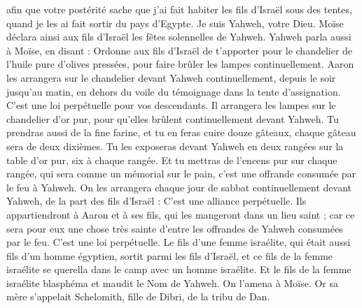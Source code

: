 \begin{multicols}{2}
afin que votre postérité sache que j'ai fait habiter les fils d'Israël sous des tentes, quand je les ai fait sortir du pays d'Egypte. Je suis Yahweh, votre Dieu.
Moïse déclara ainsi aux fils d'Israël les fêtes solennelles de Yahweh.
\VerseOne{}Yahweh parla aussi à Moïse, en disant :
Ordonne aux fils d'Israël de t'apporter pour le chandelier de l'huile pure d'olives pressées, pour faire brûler les lampes continuellement.
Aaron les arrangera sur le chandelier devant Yahweh continuellement, depuis le soir jusqu'au matin, en dehors du voile du témoignage dans la tente d'assignation. C'est une loi perpétuelle pour vos descendants.
Il arrangera les lampes sur le chandelier d'or pur, pour qu'elles brûlent continuellement devant Yahweh.
Tu prendras aussi de la fine farine, et tu en feras cuire douze gâteaux, chaque gâteau sera de deux dixièmes.
Tu les exposeras devant Yahweh en deux rangées sur la table d'or pur, six à chaque rangée.
Et tu mettras de l'encens pur sur chaque rangée, qui sera comme un mémorial sur le pain, c'est une offrande consumée par le feu à Yahweh.
On les arrangera chaque jour de sabbat continuellement devant Yahweh, de la part des fils d'Israël : C'est une alliance perpétuelle.
Ils appartiendront à Aaron et à ses fils, qui les mangeront dans un lieu saint ; car ce sera pour eux une chose très sainte d'entre les offrandes de Yahweh consumées par le feu. C'est une loi perpétuelle.
Le fils d'une femme israélite, qui était aussi fils d'un homme égyptien, sortit parmi les fils d'Israël, et ce fils de la femme israélite se querella dans le camp avec un homme israélite.
Et le fils de la femme israélite blasphéma et maudit le Nom de Yahweh. On l'amena à Moïse. Or sa mère s'appelait Schelomith, fille de Dibri, de la tribu de Dan.

\end{multicols}
